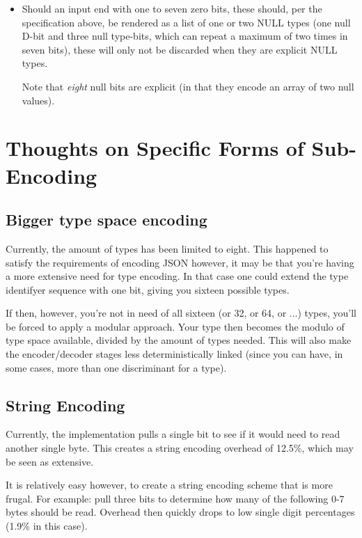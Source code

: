 \begin{itemize}
\item Should an input end with one to seven zero bits, these should, per the
  specification above, be rendered as a list of one or two NULL types
  (one null D-bit and three null type-bits, which can repeat a maximum of
  two times in seven bits), these will only not be discarded when they
  are explicit NULL types.

  Note that \textit{eight} null bits are explicit (in that they encode
  an array of two null values).
\end{itemize}

\section{Thoughts on Specific Forms of Sub-Encoding}

\subsection{Bigger type space encoding}

Currently, the amount of types has been limited to eight. This happened
to satisfy the requirements of encoding JSON however, it may be that you're
having a more extensive need for type encoding. In that case one could
extend the type identifyer sequence with one bit, giving you sixteen
possible types.

If then, however, you're not in need of all sixteen (or 32, or 64, or ...)
types, you'll be forced to apply a modular approach. Your type then
becomes the modulo of type space available, divided by the amount of
types needed. This will also make the encoder/decoder stages less
deterministically linked (since you can have, in some cases, more than
one discriminant for a type).

\subsection{String Encoding}

Currently, the implementation pulls a single bit to see if it would need
to read another single byte. This creates a string encoding overhead of
12.5\%, which may be seen as extensive.

It is relatively easy however, to create a string encoding scheme that
is more frugal. For example: pull three bits to determine how many of the
following 0-7 bytes should be read. Overhead then quickly drops to low
single digit percentages (1.9\% in this case).

